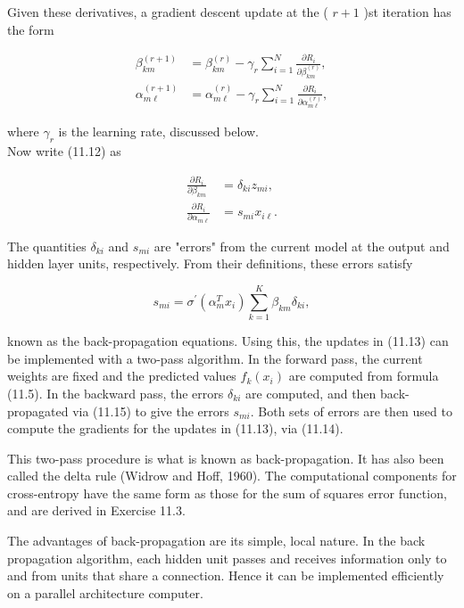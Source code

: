 \documentclass[10pt]{article}
\begin{document}
Given these derivatives, a gradient descent update at the ( $r+1$ )st iteration has the form


\begin{align*}
\beta_{k m}^{(r+1)} & =\beta_{k m}^{(r)}-\gamma_{r} \sum_{i=1}^{N} \frac{\partial R_{i}}{\partial \beta_{k m}^{(r)}},  \tag{11.13}\\
\alpha_{m \ell}^{(r+1)} & =\alpha_{m \ell}^{(r)}-\gamma_{r} \sum_{i=1}^{N} \frac{\partial R_{i}}{\partial \alpha_{m \ell}^{(r)}},
\end{align*}


where $\gamma_{r}$ is the learning rate, discussed below.\\
Now write (11.12) as


\begin{align*}
\frac{\partial R_{i}}{\partial \beta_{k m}} & =\delta_{k i} z_{m i},  \tag{11.14}\\
\frac{\partial R_{i}}{\partial \alpha_{m \ell}} & =s_{m i} x_{i \ell} .
\end{align*}


The quantities $\delta_{k i}$ and $s_{m i}$ are "errors" from the current model at the output and hidden layer units, respectively. From their definitions, these errors satisfy


\begin{equation*}
s_{m i}=\sigma^{\prime}\left(\alpha_{m}^{T} x_{i}\right) \sum_{k=1}^{K} \beta_{k m} \delta_{k i}, \tag{11.15}
\end{equation*}


known as the back-propagation equations. Using this, the updates in (11.13) can be implemented with a two-pass algorithm. In the forward pass, the current weights are fixed and the predicted values $\hat{f}_{k}\left(x_{i}\right)$ are computed from formula (11.5). In the backward pass, the errors $\delta_{k i}$ are computed, and then back-propagated via (11.15) to give the errors $s_{m i}$. Both sets of errors are then used to compute the gradients for the updates in (11.13), via (11.14).

This two-pass procedure is what is known as back-propagation. It has also been called the delta rule (Widrow and Hoff, 1960). The computational components for cross-entropy have the same form as those for the sum of squares error function, and are derived in Exercise 11.3.

The advantages of back-propagation are its simple, local nature. In the back propagation algorithm, each hidden unit passes and receives information only to and from units that share a connection. Hence it can be implemented efficiently on a parallel architecture computer.
\end{document}
